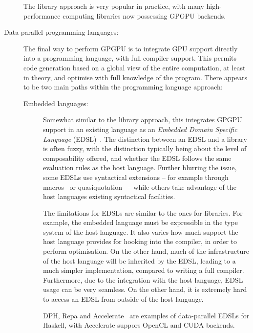 \begin{description}
  The library approach is very popular in practice, with many
  high-performance computing libraries now possessing GPGPU backends.

\item[Data-parallel programming languages:] The final way to perform
  GPGPU is to integrate GPU support directly into a programming
  language, with full compiler support.  This permits code generation
  based on a global view of the entire computation, at least in
  theory, and optimise with full knowledge of the program.  There
  appears to be two main paths within the programming language
  approach:

\begin{description}
\item[Embedded languages:] Somewhat similar to the library approach,
  this integrates GPGPU support in an existing language as an
  \textit{Embedded Domain Specific Language}
  (EDSL)~\cite{czarnecki2004dsl}.  The distinction between an EDSL and
  a library is often fuzzy, with the distinction typically being about
  the level of composability offered, and whether the EDSL follows the
  same evaluation rules as the host language.  Further blurring the
  issue, some EDSLs use syntactical extensions -- for example through
  macros~\cite{kohlbecker1986hygienic} or
  quasiquotation~\cite{mainland2007s} -- while others take advantage
  of the host languages existing syntactical facilities.

  The limitations for EDSLs are similar to the ones for libraries.
  For example, the embedded language must be expressible in the type
  system of the host language.  It also varies how much support the
  host language provides for hooking into the compiler, in order to
  perform optimisation.  On the other hand, much of the infrastructure
  of the host language will be inherited by the EDSL, leading to a
  much simpler implementation, compared to writing a full compiler.
  Furthermore, due to the integration with the host language, EDSL
  usage can be very seamless.  On the other hand, it is extremely hard
  to access an EDSL from outside of the host language.

  DPH, Repa and
  Accelerate~\cite{Chak06DPH,keller2010regular,ArrayAccelerate} are
  examples of data-parallel EDSLs for Haskell, with Accelerate suppors
  OpenCL and CUDA backends.


\end{description}
\end{description}
